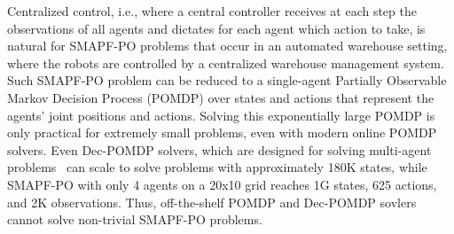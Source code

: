 \documentclass[letterpaper]{article} %
\begin{document}


Centralized control, i.e., where  a central controller receives at each step the observations of all agents and dictates for each agent which action to take, is natural for SMAPF-PO problems that occur in an automated warehouse setting, where the robots are controlled by a  centralized warehouse management system. 
Such SMAPF-PO problem can be reduced to a single-agent Partially Observable Markov Decision Process (POMDP) over states and actions that represent the agents' joint positions and actions. Solving this exponentially large POMDP is only practical for extremely small problems, even with modern online POMDP solvers. Even Dec-POMDP solvers, which are designed for solving multi-agent problems~\cite{amato2019modeling} can scale to solve problems with approximately 180K states, while SMAPF-PO with only 4 agents on a 20x10 grid reaches 1G states, 625 actions, and 2K observations. 
Thus, off-the-shelf POMDP and Dec-POMDP sovlers cannot solve non-trivial SMAPF-PO problems. 
\end{document}
